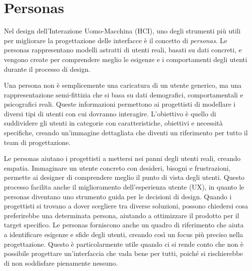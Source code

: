 \section{Personas}
Nel design dell'Interazione Uomo-Macchina (HCI), uno degli strumenti più utili per migliorare la progettazione delle interfacce è il concetto di \textit{personas}. Le personas rappresentano modelli astratti di utenti reali, basati su dati concreti, e vengono create per comprendere meglio le esigenze e i comportamenti degli utenti durante il processo di design.

Una persona non è semplicemente una caricatura di un utente generico, ma una rappresentazione semi-fittizia che si basa su dati demografici, comportamentali e psicografici reali. Queste informazioni permettono ai progettisti di modellare i diversi tipi di utenti con cui dovranno interagire. L’obiettivo è quello di suddividere gli utenti in categorie con caratteristiche, obiettivi e necessità specifiche, creando un'immagine dettagliata che diventi un riferimento per tutto il team di progettazione.

Le personas aiutano i progettisti a mettersi nei panni degli utenti reali, creando empatia. Immaginare un utente concreto con desideri, bisogni e frustrazioni, permette ai designer di comprendere meglio il punto di vista degli utenti. Questo processo facilita anche il miglioramento dell'esperienza utente (UX), in quanto le personas diventano uno strumento guida per le decisioni di design. Quando i progettisti si trovano a dover scegliere tra diverse soluzioni, possono chiedersi cosa preferirebbe una determinata persona, aiutando a ottimizzare il prodotto per il target specifico.
Le personas forniscono anche un quadro di riferimento che aiuta a identificare esigenze e sfide degli utenti, creando così un focus più preciso nella progettazione. Questo è particolarmente utile quando ci si rende conto che non è possibile progettare un'interfaccia che vada bene per tutti, poiché si rischierebbe di non soddisfare pienamente nessuno.

